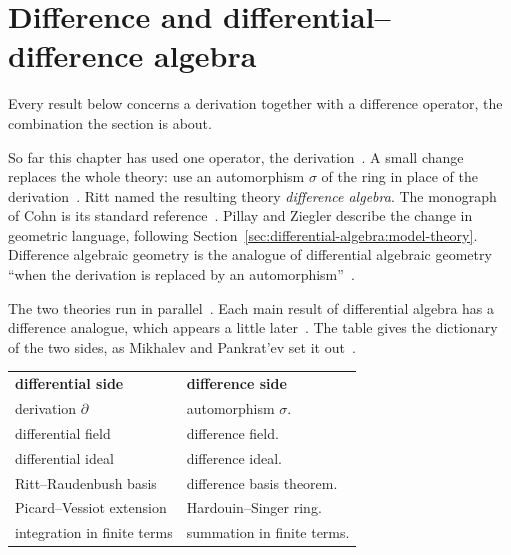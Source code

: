 \section{Difference and differential--difference algebra}\label{sec:differential-algebra:difference}

Every result below concerns a derivation together with a difference operator, the combination the section is about.

So far this chapter has used one operator, the
derivation~\cite[p.~912]{MikhalevPankratev1989}. A small change replaces the
whole theory: use an automorphism $\sigma$ of the ring in place of the
derivation~\cite[p.~912]{MikhalevPankratev1989}. Ritt named the resulting
theory \emph{difference algebra}. The monograph of Cohn is its standard
reference~\cite[p.~912]{MikhalevPankratev1989}. Pillay and Ziegler describe
the change in geometric language, following
Section~\ref{sec:differential-algebra:model-theory}. Difference algebraic
geometry is the analogue of differential algebraic geometry ``when the
derivation is replaced by an
automorphism''~\cite[p.~579]{PillayZiegler2003}.

The two theories run in parallel~\cite[p.~912]{MikhalevPankratev1989}. Each
main result of differential algebra has a difference analogue, which appears a
little later~\cite[p.~912]{MikhalevPankratev1989}. The table gives the
dictionary of the two sides, as Mikhalev and Pankrat'ev set it
out~\cite[p.~912]{MikhalevPankratev1989}.

\begin{center}
\renewcommand{\arraystretch}{1.2}
\setlength{\tabcolsep}{4pt}
\begin{tabular}{ll}
\textbf{differential side} & \textbf{difference side} \\[2pt]
derivation $\partial$ & automorphism $\sigma$. \\
differential field & difference field. \\
differential ideal & difference ideal. \\
Ritt--Raudenbush basis & difference basis theorem. \\
Picard--Vessiot extension & Hardouin--Singer ring. \\
integration in finite terms & summation in finite terms.
\end{tabular}
\end{center}

